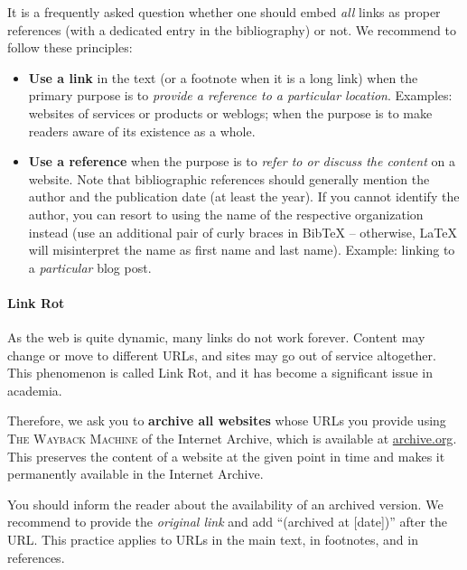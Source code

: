 It is a frequently asked question%
whether one should embed \emph{all} links as proper references (with a dedicated entry in the bibliography) or not. We recommend to follow these principles:
\begin{itemize}
  \item \textbf{Use a link} in the text (or a footnote when it is a long link) when the primary purpose is to \emph{provide a reference to a particular location}. Examples: websites of services or products or weblogs; when the purpose is to make readers aware of its existence as a whole.
  \item \textbf{Use a reference} when the purpose is to \emph{refer to or discuss the content} on a website. Note that bibliographic references should generally mention the author and the publication date (at least the year). If you cannot identify the author, you can resort to using the name of the respective organization instead (use an additional pair of curly braces in BibTeX -- otherwise, LaTeX will misinterpret the name as first name and last name). Example: linking to a \emph{particular} blog post.
\end{itemize}

\paragraph{Link Rot}

As the web is quite dynamic, many links do not work forever.%
Content may change or move to different URLs, and sites may go out of service altogether. This phenomenon is called Link Rot, and it has become a significant issue in academia.

Therefore, we ask you to \textbf{archive all websites} whose URLs you provide using \textsc{The Wayback Machine} of the Internet Archive, which is available at \url{archive.org}.
This preserves the content of a website at the given point in time and makes it permanently available in the Internet Archive.

You should inform the reader about the availability of an archived version.%
We recommend to provide the \emph{original link} and add ``(archived at [date])'' after the URL. This practice applies to URLs in the main text, in footnotes, and in references.

